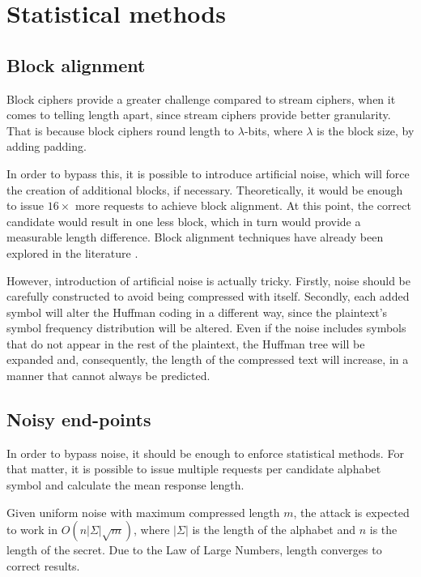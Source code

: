 \documentclass[a4paper, 11 pt, conference]{article}  %
\begin{document}

\section{Statistical methods}

\subsection{Block alignment}

Block ciphers provide a greater challenge compared to stream ciphers, when it
comes to telling length apart, since stream ciphers provide better granularity. That
is because block ciphers round length to $\lambda$-bits, where $\lambda$ is the block size,
by adding padding.

In order to bypass this, it is possible to introduce artificial noise, which will force the creation of
additional blocks, if necessary. Theoretically, it would be enough to issue
$16\times$ more requests
to achieve block alignment. At this point, the correct candidate would result in one less
block, which in turn would provide a measurable length difference. Block
alignment techniques have already been explored in the literature \cite{c9}.

However, introduction of artificial noise is actually tricky. Firstly, noise should be carefully constructed
to avoid being compressed with itself. Secondly, each added symbol will alter the Huffman coding in a
different way, since the plaintext's symbol frequency distribution will be altered. Even if the noise
includes symbols that do not appear in the rest of the plaintext, the Huffman tree will be expanded and,
consequently, the length of the compressed text will increase, in a manner that cannot always be
predicted.

\subsection{Noisy end-points}

In order to bypass noise, it should be enough to enforce statistical methods.
For that matter, it is possible to issue multiple requests per candidate alphabet symbol
and calculate the mean response length.

Given uniform noise with maximum compressed length $m$, the attack is expected to work in $O(n|\Sigma|\sqrt{m})$, where
$|\Sigma|$ is the length of the alphabet and $n$ is the length of the secret. Due to the Law of Large Numbers, length
converges to correct results.
\end{document}
